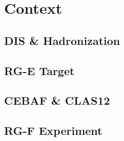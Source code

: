 \section*{}
\begin{frame}{}
    \centering \Huge{}
\end{frame}

\section{Context}
\subsection{DIS \& Hadronization}


\subsection{RG-E Target}


\subsection{CEBAF \& CLAS12}


\subsection{RG-F Experiment}

